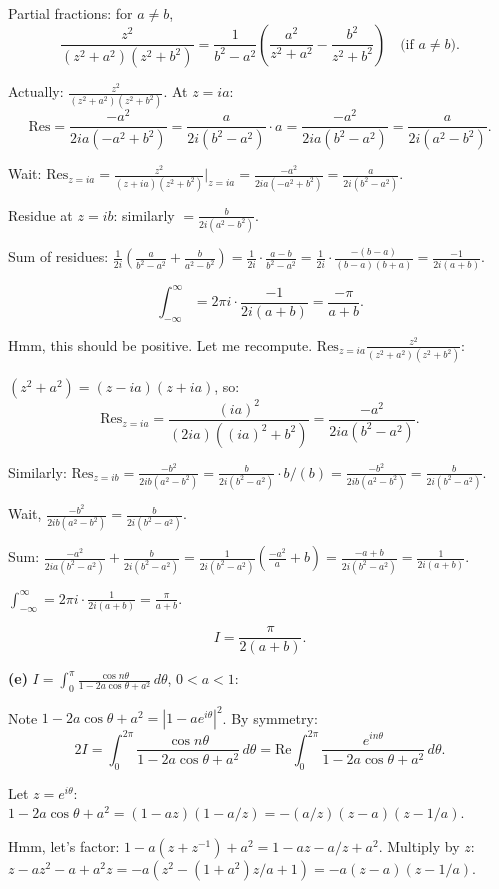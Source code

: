 \documentclass[12pt]{article}
\begin{document}
Partial fractions: for $a \neq b$,
\[
\frac{z^2}{(z^2+a^2)(z^2+b^2)} = \frac{1}{b^2-a^2}\left(\frac{a^2}{z^2+a^2}-\frac{b^2}{z^2+b^2}\right) \quad \text{(if } a \neq b\text{)}.
\]

Actually: $\frac{z^2}{(z^2+a^2)(z^2+b^2)}$. At $z = ia$:
\[
\text{Res} = \frac{-a^2}{2ia(-a^2+b^2)} = \frac{a}{2i(b^2-a^2)} \cdot a = \frac{-a^2}{2ia(b^2-a^2)} = \frac{a}{2i(a^2-b^2)}.
\]

Wait: $\text{Res}_{z=ia} = \frac{z^2}{(z+ia)(z^2+b^2)}\Big|_{z=ia} = \frac{-a^2}{2ia(-a^2+b^2)} = \frac{a}{2i(b^2-a^2)}$.

Residue at $z = ib$: similarly $= \frac{b}{2i(a^2-b^2)}$.

Sum of residues: $\frac{1}{2i}\left(\frac{a}{b^2-a^2}+\frac{b}{a^2-b^2}\right) = \frac{1}{2i}\cdot\frac{a-b}{b^2-a^2} = \frac{1}{2i}\cdot\frac{-(b-a)}{(b-a)(b+a)} = \frac{-1}{2i(a+b)}$.

\[
\int_{-\infty}^{\infty} = 2\pi i\cdot\frac{-1}{2i(a+b)} = \frac{-\pi}{a+b}.
\]

Hmm, this should be positive. Let me recompute. $\text{Res}_{z=ia}\frac{z^2}{(z^2+a^2)(z^2+b^2)}$:

$(z^2+a^2) = (z-ia)(z+ia)$, so:
\[
\text{Res}_{z=ia} = \frac{(ia)^2}{(2ia)((ia)^2+b^2)} = \frac{-a^2}{2ia(b^2-a^2)}.
\]

Similarly: $\text{Res}_{z=ib} = \frac{-b^2}{2ib(a^2-b^2)} = \frac{b}{2i(b^2-a^2)} \cdot b/(b) = \frac{-b^2}{2ib(a^2-b^2)} = \frac{b}{2i(b^2-a^2)}$.

Wait, $\frac{-b^2}{2ib(a^2-b^2)} = \frac{b}{2i(b^2-a^2)}$.

Sum: $\frac{-a^2}{2ia(b^2-a^2)} + \frac{b}{2i(b^2-a^2)} = \frac{1}{2i(b^2-a^2)}\left(\frac{-a^2}{a}+b\right) = \frac{-a+b}{2i(b^2-a^2)} = \frac{1}{2i(a+b)}$.

$\int_{-\infty}^{\infty} = 2\pi i \cdot \frac{1}{2i(a+b)} = \frac{\pi}{a+b}$.

\[
\boxed{I = \frac{\pi}{2(a+b)}}.
\]

\textbf{(e)} $\displaystyle I = \int_0^{\pi}\frac{\cos n\theta}{1-2a\cos\theta+a^2}\,d\theta$, $0<a<1$:

Note $1 - 2a\cos\theta + a^2 = |1-ae^{i\theta}|^2$. By symmetry:
\[
2I = \int_0^{2\pi}\frac{\cos n\theta}{1-2a\cos\theta+a^2}\,d\theta = \text{Re}\int_0^{2\pi}\frac{e^{in\theta}}{1-2a\cos\theta+a^2}\,d\theta.
\]

Let $z = e^{i\theta}$: $1-2a\cos\theta+a^2 = (1-az)(1-a/z) = -(a/z)(z-a)(z-1/a)$.

Hmm, let's factor: $1 - a(z+z^{-1}) + a^2 = 1 - az - a/z + a^2$. Multiply by $z$: $z - az^2 - a + a^2z = -a(z^2-(1+a^2)z/a + 1) = -a(z-a)(z-1/a)$.
\end{document}
